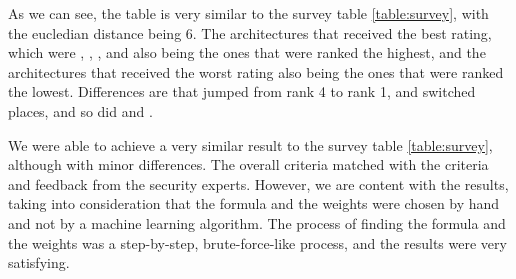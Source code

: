 As we can see, the table is very similar to the survey table \ref{table:survey}, with the eucledian distance being 6.
The architectures that received the best rating, which were 
, , , and  
also being the ones that were ranked the highest,
and the architectures that received the worst rating also being the ones that were ranked the lowest.
Differences are that  jumped from rank 4 to rank 1,  and  switched places, 
and so did  and .

We were able to achieve a very similar result to the survey table \ref{table:survey}, although with minor differences.
The overall criteria matched with the criteria and feedback from the security experts.
However, we are content with the results, taking into consideration that the formula and the weights were chosen by hand and not by a machine learning algorithm.
The process of finding the formula and the weights was a step-by-step, brute-force-like process, and the results were very satisfying.\\

\hfill \break